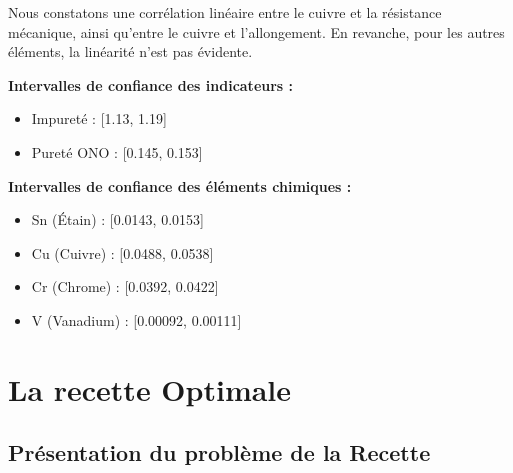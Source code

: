 \documentclass[12pt]{article}
\begin{document}

Nous constatons une corrélation linéaire entre le cuivre et la résistance mécanique, ainsi qu'entre le cuivre et l'allongement. En revanche, pour les autres éléments, la linéarité n'est pas  évidente.



\textbf{Intervalles de confiance des indicateurs :}
\begin{itemize}
\item Impureté : [1.13, 1.19]
\item Pureté ONO : [0.145, 0.153]
\end{itemize}

\textbf{Intervalles de confiance des éléments chimiques :}
\begin{itemize}
\item Sn (Étain) : [0.0143, 0.0153]
\item Cu (Cuivre) : [0.0488, 0.0538]
\item Cr (Chrome) : [0.0392, 0.0422]
\item V (Vanadium) : [0.00092, 0.00111]
\end{itemize}


















\section{La recette Optimale}

\subsection{Présentation du problème de la Recette }
\end{document}
